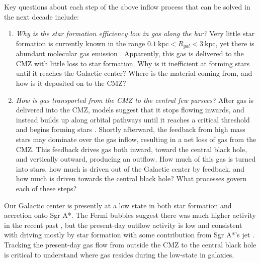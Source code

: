 \documentclass[modern]{aastex62}
\def\agnote#1{{\color{red}#1}}
\begin{document}
Key questions about each step of the above inflow process that can be solved in
the next decade include:
\begin{enumerate}
    \item 
\textit{Why is the star formation efficiency low in gas along the bar?}
Very little star formation is currently known in the range $0.1 \mathrm{~kpc} <
R_{gal} < 3 \mathrm{~kpc}$, yet there is abundant molecular gas emission
\citep[e.g.,][]{Dame2001a}.  Apparently, this gas is delivered to the CMZ
with little loss to star formation.  Why is it inefficient
at forming stars until it reaches the Galactic center?  Where is the material
coming from, and how is it deposited on to the CMZ?


%

    \item 
\textit{How is gas transported from the CMZ to the central few parsecs?}
After gas is delivered into the CMZ, models suggest that it stops flowing inwards, and instead builds up along orbital pathways until it reaches a critical threshold and begins forming stars
\citep{Kruijssen2014c,Krumholz2017a,Sormani2018b,Jeffreson2018b}.  Shortly
afterward, the feedback from high mass stars may dominate over the gas inflow,
resulting in a net loss of gas from the CMZ.  This feedback drives gas both
inward, toward the central black hole, and vertically outward, producing an
outflow. How much of this gas is turned into stars, how much is driven out of
the Galactic center by feedback, and how much is driven towards the central
black hole?  What processes govern each of these steps? 
\end{enumerate}

Our Galactic center is presently at a low state in both star formation and
accretion onto Sgr A*.  The Fermi bubbles suggest there was much higher
activity in the recent past \citep{Su2010a}, but the present-day
outflow activity is low and consistent with driving mostly by star formation
\citep{Law2009a,Law2010a} with some contribution from Sgr A*'s jet
\citep{Muno2008a,Li2013f,Zhu2018b}. Tracking the present-day gas flow from outside
the CMZ to the central black hole is critical
to understand where gas resides during the low-state in galaxies.
\end{document}
